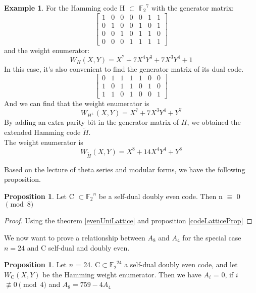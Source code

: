 \documentclass[12pt]{article}
\theoremstyle{definition}
\newtheorem{example}[theorem]{Example}
\newtheorem{prop}[theorem]{Proposition}
\numberwithin{equation}{theorem}
\numberwithin{figure}{theorem}
\newcommand{\Ftwo}{\ensuremath{\mathbb{F}_2}}
\newcommand{\simpleCodes}{\ensuremath{\mathrm{C}}}
\newcommand{\buildVertical}[1]{\ensuremath{#1^{\bot}}}
\newcommand{\weightEnumerator}[3]{\ensuremath{W_{#1}(#2,#3)}}
\begin{document}
\begin{example}\label{hammingExample}
	For the Hamming code H $\subset$ $\Ftwo^7$ with the generator matrix:
	\[
	\left[
		\begin{matrix}
			1 &0 &0 &0 &0 &1 &1 \\
			0 &1 &0 &0 &1 &0 &1 \\
			0 &0 &1 &0 &1 &1 &0 \\
			0 &0 &0 &1 &1 &1 &1
		\end{matrix}
	\right]
	\]
	and the weight enumerator:
	\[
		\weightEnumerator{H}{X}{Y} = X^7 + 7X^4Y^3 + 7X^3Y^4 + 1
	\]
	In this case, it's also convenient to find the generator matrix of its dual code.
	\[
		\left[
			\begin{matrix}
				0 & 1 & 1 & 1 & 1 & 0 & 0 \\
				1 & 0 & 1 & 1 & 0 & 1 & 0 \\
				1 & 1 & 0 & 1 & 0 & 0 & 1
			\end{matrix}
		\right]
	\]
	And we can find that the weight enumerator is 
	\[
		\weightEnumerator{\buildVertical{H}}{X}{Y} = X^7 + 7X^3Y^4 + Y^7
 	\]
 	By adding an extra parity bit in the generator matrix of $H$, we obtained the extended Hamming code $\widetilde{H}$.\\
 	The weight enumerator is
 	\[
 		\weightEnumerator{\widetilde{H}}{X}{Y} = X^8 + 14X^4Y^4 + Y^8
 	\]
\end{example}
Based on the lecture of theta series and modular forms, we have the following proposition.
\begin{prop}
Let {\simpleCodes} $\subset \Ftwo^n$ be a self-dual doubly even code. Then n $\equiv$ 0 $\pmod 8$ 
\end{prop}
\begin{proof}
Using the theorem \ref{evenUniLattice} and proposition \ref{codeLatticeProp}
\end{proof}
We now want to prove a relationship between $A_8$ and $A_4$ for the special case $n = 24$ and $\simpleCodes$ self-dual and doubly even.
\begin{prop}\label{A8A4}
Let $n$ = 24. $\simpleCodes \subset \Ftwo^{24}$ a self-dual doubly even code, and let {\weightEnumerator{\simpleCodes}{X}{Y}} be the Hamming weight enumerator. Then we have $A_i$ = 0, if $i$ $\not\equiv 0 \pmod 4$ and $A_8 = 759 - 4 A_4$
\end{prop}
\end{document}
